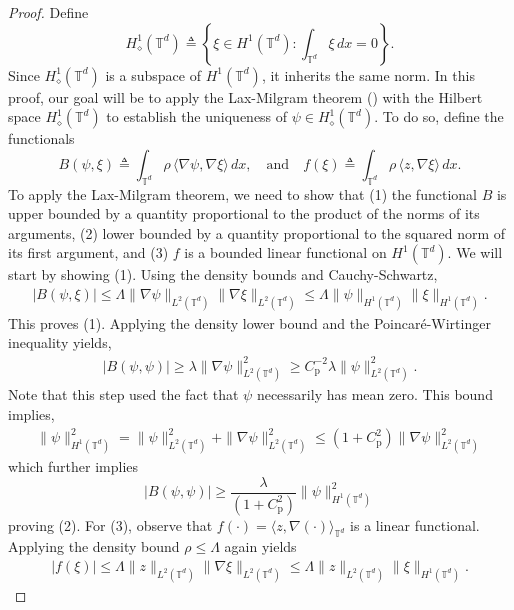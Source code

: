 \documentclass[11pt]{article}
\begin{document}
\begin{proof}
    Define 
    \[H_{{\diamond}}^1(\mathbb{T}^d) \triangleq \left\{\xi \in H^1(\mathbb{T}^d) : \int_{\mathbb{T}^d}\xi \, dx = 0\right\}.\]
    Since $H^1_\diamond(\mathbb{T}^d)$ is a subspace of $H^1(\mathbb{T}^d)$, it inherits the same norm. In this proof, our goal will be to apply the Lax-Milgram theorem () with the Hilbert space $H^1_{\diamond}(\mathbb{T}^d)$ to establish the uniqueness of $\psi \in H^1_\diamond(\mathbb{T}^d).$  To do so, define the functionals
    \[B(\psi, \xi) \triangleq \int_{\mathbb{T}^d}\rho \, \langle \nabla \psi, \nabla \xi\rangle \, dx, \quad \text{and} \quad f(\xi) \triangleq \int_{\mathbb{T}^d}\rho \, \langle z, \nabla \xi\rangle\, dx.\]
    To apply the Lax-Milgram theorem, we need to show that (1) the functional $B$ is upper bounded by a quantity proportional to the product of the norms of its arguments, (2) lower bounded by a quantity proportional to the squared norm of its first argument, and (3) $f$ is a bounded linear functional on $H^1(\mathbb{T}^d).$ We will start by showing (1). Using the density bounds and Cauchy-Schwartz, 
    \begin{align*}
        |B(\psi, \xi)| \leq \Lambda\|\nabla \psi\|_{L^2(\mathbb{T}^d)} \|\nabla \xi\|_{L^2(\mathbb{T}^d)} \leq \Lambda \|\psi\|_{H^1(\mathbb{T}^d)} \|\xi\|_{H^1(\mathbb{T}^d)}.
    \end{align*}
    This proves (1). Applying the density lower bound and the Poincar\'e-Wirtinger inequality \citep{cioranescu1999introduction} yields,
    \begin{align*}
        |B(\psi, \psi)| \geq \lambda \|\nabla \psi\|_{L^2(\mathbb{T}^d)}^2 \geq C_\text{p}^{-2}\lambda\|\psi\|_{L^2(\mathbb{T}^d)}^2.
    \end{align*}
    Note that this step used the fact that $\psi$ necessarily has mean zero. This bound implies,
    \begin{align*}
        \|\psi\|_{H^1(\mathbb{T}^d)}^2 = \|\psi\|_{L^2(\mathbb{T}^d)}^2 + \|\nabla \psi\|_{L^2(\mathbb{T}^d)}^2 \leq \left(1 + C_{\text{p}}^2\right)\|\nabla \psi\|_{L^2(\mathbb{T}^d)}^2
    \end{align*}
    which further implies 
    \[|B(\psi, \psi)| \geq\frac{\lambda}{(1 + C_\text{p}^2)}\|\psi\|_{H^1(\mathbb{T}^d)}^2\]
    proving (2). For (3), observe that $f(\cdot) = \langle z, \nabla (\cdot)\rangle_{\mathbb{T}^d}$ is a linear functional. Applying the density bound $\rho \leq \Lambda$ again yields
    \begin{align*}
        |f(\xi)| \leq \Lambda\|z\|_{L^2(\mathbb{T}^d)}\|\nabla \xi\|_{L^2(\mathbb{T}^d)} \leq \Lambda\|z\|_{L^2(\mathbb{T}^d)}\| \xi\|_{H^1(\mathbb{T}^d)}.

\end{align*}
\end{proof}
\end{document}
